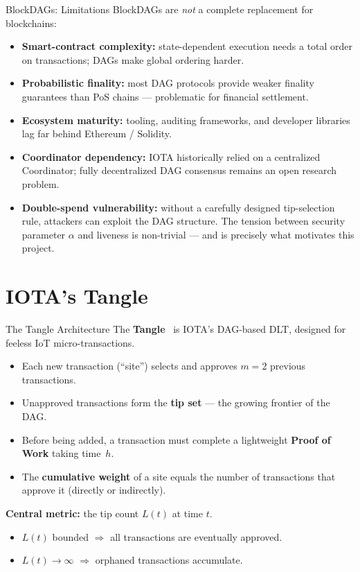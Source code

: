 \documentclass[aspectratio=169]{beamer}
\begin{document}
\begin{frame}{BlockDAGs: Limitations}
  BlockDAGs are \emph{not} a complete replacement for blockchains:
  \begin{itemize}
    \item \textbf{Smart-contract complexity:} state-dependent execution needs a total order on transactions; DAGs make global ordering harder.
    \item \textbf{Probabilistic finality:} most DAG protocols provide weaker finality guarantees than PoS chains --- problematic for financial settlement.
    \item \textbf{Ecosystem maturity:} tooling, auditing frameworks, and developer libraries lag far behind Ethereum / Solidity.
    \item \textbf{Coordinator dependency:} IOTA historically relied on a centralized Coordinator; fully decentralized DAG consensus remains an open research problem.
    \item \textbf{Double-spend vulnerability:} without a carefully designed tip-selection rule, attackers can exploit the DAG structure.  The tension between security parameter $\alpha$ and liveness is non-trivial --- and is precisely what motivates this project.
  \end{itemize}
\end{frame}

\section{IOTA's Tangle}

\begin{frame}{The Tangle Architecture}
  The \textbf{Tangle}~\cite{popov2018} is IOTA's DAG-based DLT, designed for feeless IoT micro-transactions.

  \bigskip
  \begin{itemize}
    \item Each new transaction (``site'') selects and approves $m=2$ previous transactions.
    \item Unapproved transactions form the \textbf{tip set} --- the growing frontier of the DAG.
    \item Before being added, a transaction must complete a lightweight \textbf{Proof of Work} taking time~$h$.
    \item The \textbf{cumulative weight} of a site equals the number of transactions that approve it (directly or indirectly).
  \end{itemize}

  \bigskip
  \textbf{Central metric:} the tip count $L(t)$ at time $t$.
  \begin{itemize}
    \item $L(t)$ bounded $\Rightarrow$ all transactions are eventually approved.
    \item $L(t) \to \infty$ $\Rightarrow$ orphaned transactions accumulate.
  \end{itemize}
\end{frame}
\end{document}
